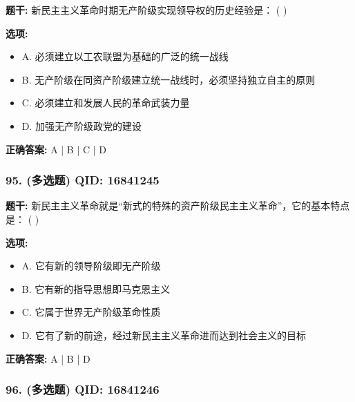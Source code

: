 \documentclass[12pt,UTF8]{ctexart}
\begin{document}
\textbf{题干:}
新民主主义革命时期无产阶级实现领导权的历史经验是： ( )

\textbf{选项:}
\begin{itemize}[leftmargin=*]

  \item A. 必须建立以工农联盟为基础的广泛的统一战线

  \item B. 无产阶级在同资产阶级建立统一战线时，必须坚持独立自主的原则

  \item C. 必须建立和发展人民的革命武装力量

  \item D. 加强无产阶级政党的建设

\end{itemize}

\textbf{正确答案:}
A | B | C | D

\vspace{0.3em}\hrulefill\vspace{0.7em}

\subsubsection*{95. (多选题) \small QID: 16841245}

\textbf{题干:}
新民主主义革命就是“新式的特殊的资产阶级民主主义革命”，它的基本特点是： ( )

\textbf{选项:}
\begin{itemize}[leftmargin=*]

  \item A. 它有新的领导阶级即无产阶级

  \item B. 它有新的指导思想即马克恩主义

  \item C. 它属于世界无产阶级革命性质

  \item D. 它有了新的前途，经过新民主主义革命进而达到社会主义的目标

\end{itemize}

\textbf{正确答案:}
A | B | D

\vspace{0.3em}\hrulefill\vspace{0.7em}

\subsubsection*{96. (多选题) \small QID: 16841246}
\end{document}
